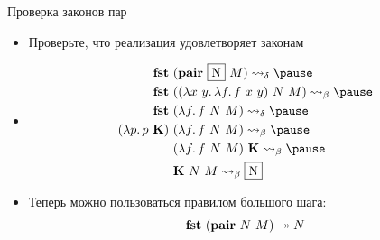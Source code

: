     \begin{frame}[fragile]{Проверка законов пар}
        \begin{itemize}
            \item[\todo] Проверьте, что реализация удовлетворяет законам
            \item[\answer] \pause
            \begin{align*}
                \term{fst} \ap &(\term{pair} \ap \framebox{N} \ap M)
                \step_\delta \pause \\
                \term{fst} \ap &((\lambda x~y\ldotp \lambda f \ldotp f \ap x \ap y) \ap N \ap M)
                \step_\beta \pause \\
                \term{fst} \ap &(\lambda f \ldotp f \ap N \ap M)
                \step_\delta \pause \\
                (\lambda p \ldotp p \ap \term{K}) \ap &(\lambda f \ldotp f \ap N \ap M)
                \step_\beta \pause \\
                &(\lambda f \ldotp f \ap N \ap M) \ap \term{K}
                \step_\beta \pause \\
                &\term{K} \ap N \ap M \step_{\beta} \framebox{N}
            \end{align*}
            \item Теперь можно пользоваться правилом большого шага:
            \begin{equation*}
                \mathbf{fst} ~ (\mathbf{pair} ~ N ~ M) \twoheadrightarrow N
            \end{equation*}
        \end{itemize}
    \end{frame}

